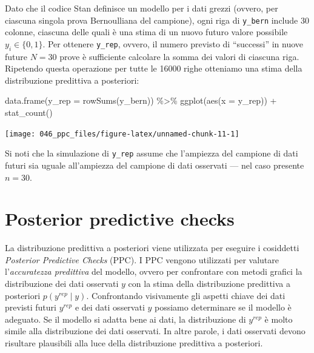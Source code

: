 \documentclass[
  11pt,
  italian,
  a4paper,
  extrafontsizes,onecolumn,openright
  ]{memoir}
\newenvironment{Shaded}{\begin{snugshade}}{\end{snugshade}}
\newcommand{\AttributeTok}[1]{\textcolor[rgb]{0.77,0.63,0.00}{#1}}
\newcommand{\FunctionTok}[1]{\textcolor[rgb]{0.00,0.00,0.00}{#1}}
\newcommand{\NormalTok}[1]{#1}
\newcommand{\SpecialCharTok}[1]{\textcolor[rgb]{0.00,0.00,0.00}{#1}}
\theoremstyle{definition}
\theoremstyle{definition}
\theoremstyle{definition}
\theoremstyle{definition}
\theoremstyle{remark}
\begin{document}
Dato che il codice Stan definisce un modello per i dati grezzi (ovvero, per ciascuna singola prova Bernoulliana del campione), ogni riga di \texttt{y\_bern} include 30 colonne, ciascuna delle quali è una stima di un nuovo futuro valore possibile \(y_i \in \{0, 1\}\). Per ottenere \texttt{y\_rep}, ovvero, il numero previsto di ``successi'' in nuove future \(N = 30\) prove è sufficiente calcolare la somma dei valori di ciascuna riga. Ripetendo questa operazione per tutte le 16000 righe otteniamo una stima della distribuzione predittiva a posteriori:

\begin{Shaded}
\begin{Highlighting}[]
\FunctionTok{data.frame}\NormalTok{(}\AttributeTok{y\_rep =} \FunctionTok{rowSums}\NormalTok{(y\_bern)) }\SpecialCharTok{\%\textgreater{}\%}
  \FunctionTok{ggplot}\NormalTok{(}\FunctionTok{aes}\NormalTok{(}\AttributeTok{x =}\NormalTok{ y\_rep)) }\SpecialCharTok{+}
  \FunctionTok{stat\_count}\NormalTok{()}
\end{Highlighting}
\end{Shaded}

\begin{center}\texttt{[image: 046\_ppc\_files/figure-latex/unnamed-chunk-11-1]} \end{center}

Si noti che la simulazione di \texttt{y\_rep} assume che l'ampiezza del campione di dati futuri sia uguale all'ampiezza del campione di dati osservati --- nel caso presente \(n = 30\).

\hypertarget{posterior-predictive-checks}{%
\section{Posterior predictive checks}\label{posterior-predictive-checks}}

La distribuzione predittiva a posteriori viene utilizzata per eseguire i cosiddetti \emph{Posterior Predictive Checks} (PPC). I PPC vengono utilizzati per valutare l'\emph{accuratezza predittiva} del modello, ovvero per confrontare con metodi grafici la distribuzione dei dati osservati \(y\) con la stima della distribuzione predittiva a posteriori \(p(y^{rep} \mid y)\). Confrontando visivamente gli aspetti chiave dei dati previsti futuri \(y^{rep}\) e dei dati osservati \(y\) possiamo determinare se il modello è adeguato. Se il modello si adatta bene ai dati, la distribuzione di \(y^{rep}\) è molto simile alla distribuzione dei dati osservati. In altre parole, i dati osservati devono risultare plausibili alla luce della distribuzione predittiva a posteriori.
\end{document}
